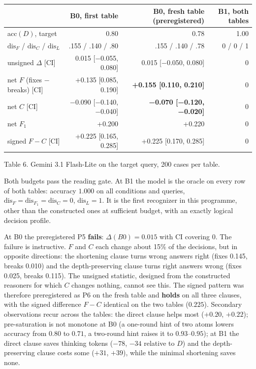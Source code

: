 {\def\LTcaptype{none} %
\begin{longtable}[]{@{}lrrr@{}}
\toprule\noalign{}
& B0, first table & B0, fresh table (preregistered) & B1, both tables \\
\midrule\noalign{}
\endhead
\bottomrule\noalign{}
\endlastfoot
acc\((D)\), target & 0.80 & 0.78 & 1.00 \\
\(\mathrm{dis}_F\) / \(\mathrm{dis}_C\) / \(\mathrm{dis}_L\) & .155 / .140 / .80 & .155 / .140 / .78 & 0 / 0 / 1 \\
unsigned \(\Delta\) {[}CI{]} & 0.015 {[}−0.055, 0.080{]} & 0.015 {[}−0.050, 0.080{]} & 0 \\
net \(F\) (fixes − breaks) {[}CI{]} & +0.135 {[}0.085, 0.190{]} & \textbf{+0.155 {[}0.110, 0.210{]}} & 0 \\
net \(C\) {[}CI{]} & −0.090 {[}−0.140, −0.040{]} & \textbf{−0.070 {[}−0.120, −0.020{]}} & 0 \\
net \(F_1\) & +0.200 & +0.220 & 0 \\
signed \(F-C\) {[}CI{]} & +0.225 {[}0.165, 0.285{]} & +0.225 {[}0.170, 0.285{]} & 0 \\
\end{longtable}
}

Table 6. Gemini 3.1 Flash-Lite on the target query, 200 cases per table.

Both budgets pass the reading gate. At B1 the model is the oracle on every row of both tables: accuracy \(1.000\) on all conditions and queries, \(\mathrm{dis}_F=\mathrm{dis}_{F_1}=\mathrm{dis}_C=0\), \(\mathrm{dis}_L=1\). It is the first recognizer in this programme, other than the constructed ones at sufficient budget, with an exactly logical decision profile.

At B0 the preregistered P5 \textbf{fails}: \(\Delta(B0)=0.015\) with CI covering 0. The failure is instructive. \(F\) and \(C\) each change about 15\% of the decisions, but in opposite directions: the shortening clause turns wrong answers right (fixes 0.145, breaks 0.010) and the depth-preserving clause turns right answers wrong (fixes 0.025, breaks 0.115). The unsigned statistic, designed from the constructed reasoners for which \(C\) changes nothing, cannot see this. The signed pattern was therefore preregistered as P6 on the fresh table and \textbf{holds} on all three clauses, with the signed difference \(F-C\) identical on the two tables (\(0.225\)). Secondary observations recur across the tables: the direct clause helps most (\(+0.20\), \(+0.22\)); pre-saturation is not monotone at B0 (a one-round hint of two atoms lowers accuracy from \(0.80\) to \(0.71\), a two-round hint raises it to \(0.93\)--\(0.95\)); at B1 the direct clause saves thinking tokens (\(-78\), \(-34\) relative to \(D\)) and the depth-preserving clause costs some (\(+31\), \(+39\)), while the minimal shortening saves none.

